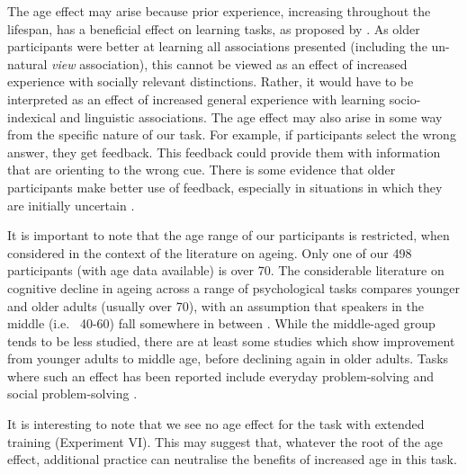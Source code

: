\documentclass{frontiersSCNS} %
\begin{document}
The age effect may arise because  prior experience, increasing throughout the lifespan, has a beneficial effect on learning tasks, as proposed by  \cite{ramscar2014myth}.  As older participants were better at learning all associations presented (including the un-natural \emph{view} association), this cannot be viewed as an effect of increased experience with socially relevant distinctions.  Rather, it would have to be interpreted as an effect of increased general experience with learning socio-indexical and linguistic associations.    The age effect may also arise in some way from the specific nature of our task.  For example, if participants select the wrong answer, they get feedback.  This feedback could provide them with information that are orienting to the wrong cue.  There is some evidence that older participants make better use of feedback, especially in situations in which they are initially uncertain \citep{metcalfe2015}.  

It is important to note that the age range of our participants is restricted, when considered in the context of the literature on ageing.  Only one of our 498 participants (with age data available) is over 70.   The considerable literature on cognitive decline in ageing across a range of psychological tasks compares younger and older adults (usually over 70), with an assumption that speakers in the middle (i.e. ~40-60) fall somewhere in between \citep{lachman2004development}.  While the middle-aged group tends to be less studied, there are at least some studies which show improvement from younger adults to middle age, before declining again in older adults.  Tasks where such an effect has been reported include everyday problem-solving \citep{thornton2013age} and social problem-solving \citep{d1998age}.

 It is interesting to note that we see no age effect for the task with extended training (Experiment VI). This may suggest that, whatever the root of the age effect, additional practice can neutralise the benefits of increased age in this task.
\end{document}
